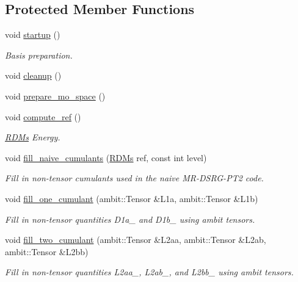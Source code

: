 \subsection*{Protected Member Functions}
\begin{DoxyCompactItemize}
\item 
void \mbox{\hyperlink{classforte_1_1_m_c_s_r_g_p_t2___m_o_a47e338c51626a323fb371aa5a7b1aa02}{startup}} ()
\begin{DoxyCompactList}\small\item\em Basis preparation. \end{DoxyCompactList}\item 
void \mbox{\hyperlink{classforte_1_1_m_c_s_r_g_p_t2___m_o_a54d13435f0e25a148cc8dc176ccbc1b6}{cleanup}} ()
\item 
void \mbox{\hyperlink{classforte_1_1_m_c_s_r_g_p_t2___m_o_a81773e4db7c548a9f6c24374056dc008}{prepare\+\_\+mo\+\_\+space}} ()
\item 
void \mbox{\hyperlink{classforte_1_1_m_c_s_r_g_p_t2___m_o_ad064311348ef7d691c755ae854ade618}{compute\+\_\+ref}} ()
\begin{DoxyCompactList}\small\item\em \mbox{\hyperlink{classforte_1_1_r_d_ms}{R\+D\+Ms}} Energy. \end{DoxyCompactList}\item 
void \mbox{\hyperlink{classforte_1_1_m_c_s_r_g_p_t2___m_o_a44467184902a50fafd224ff1230b80a7}{fill\+\_\+naive\+\_\+cumulants}} (\mbox{\hyperlink{classforte_1_1_r_d_ms}{R\+D\+Ms}} ref, const int level)
\begin{DoxyCompactList}\small\item\em Fill in non-\/tensor cumulants used in the naive M\+R-\/\+D\+S\+R\+G-\/\+P\+T2 code. \end{DoxyCompactList}\item 
void \mbox{\hyperlink{classforte_1_1_m_c_s_r_g_p_t2___m_o_a2b21f9a413f49f41449a3a94b1576c88}{fill\+\_\+one\+\_\+cumulant}} (ambit\+::\+Tensor \&L1a, ambit\+::\+Tensor \&L1b)
\begin{DoxyCompactList}\small\item\em Fill in non-\/tensor quantities D1a\+\_\+ and D1b\+\_\+ using ambit tensors. \end{DoxyCompactList}\item 
void \mbox{\hyperlink{classforte_1_1_m_c_s_r_g_p_t2___m_o_a16a2294f9dda61114a38f0652144fa7d}{fill\+\_\+two\+\_\+cumulant}} (ambit\+::\+Tensor \&L2aa, ambit\+::\+Tensor \&L2ab, ambit\+::\+Tensor \&L2bb)
\begin{DoxyCompactList}\small\item\em Fill in non-\/tensor quantities L2aa\+\_\+, L2ab\+\_\+, and L2bb\+\_\+ using ambit tensors. \end{DoxyCompactList}\item 

\end{DoxyCompactItemize}

